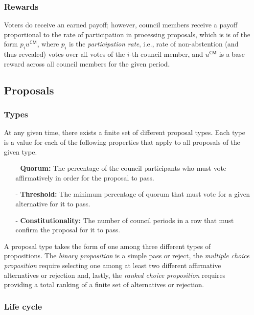\documentclass{article}
\begin{document}

\subsubsection{Rewards}

Voters do receive an earned payoff; however, council members receive a payoff proportional to the rate of participation in processing proposals, which is is of the form $p_{i}u^{\mathsf{CM}}$, where $p_i$ is the \textit{participation rate}, i.e., rate of non-abstention (and thus revealed) votes over all votes of the $i$-th council member, and $u^{\mathsf{CM}}$ is a base reward across all council members for the given period.

\subsection{Proposals}

\subsubsection{Types}

At any given time, there exists a finite set of different proposal types. Each type is a value for each of the following properties that apply to all proposals of the given type.

\begin{itemize}
  \item[-] \textbf{Quorum:} The percentage of the council participants who must vote affirmatively in order for the proposal to pass.
  \item[-] \textbf{Threshold:} The minimum percentage of quorum that must vote for a given alternative for it to pass.
  \item[-] \textbf{Constitutionality:} The number of council periods in a row that must confirm the proposal for it to pass.
\end{itemize}

A proposal type takes the form of one among three different types of propositions. The \textit{binary proposition} is a simple pass or reject, the \textit{multiple choice proposition} require selecting one among at least two different affirmative alternatives or rejection and, lastly, the \textit{ranked choice proposition} requires providing a total ranking of a finite set of alternatives or rejection.

\subsubsection{Life cycle}
\end{document}

